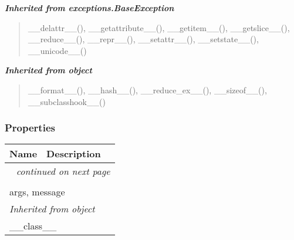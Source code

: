 \large{\textbf{\textit{Inherited from exceptions.BaseException}}}

\begin{quote}
\_\_delattr\_\_(), \_\_getattribute\_\_(), \_\_getitem\_\_(), \_\_getslice\_\_(), \_\_reduce\_\_(), \_\_repr\_\_(), \_\_setattr\_\_(), \_\_setstate\_\_(), \_\_unicode\_\_()
\end{quote}

\large{\textbf{\textit{Inherited from object}}}

\begin{quote}
\_\_format\_\_(), \_\_hash\_\_(), \_\_reduce\_ex\_\_(), \_\_sizeof\_\_(), \_\_subclasshook\_\_()
\end{quote}


  \subsubsection{Properties}

    \vspace{-1cm}
\hspace{\varindent}\begin{longtable}{|p{\varnamewidth}|p{\vardescrwidth}|l}
\cline{1-2}
\cline{1-2} \centering \textbf{Name} & \centering \textbf{Description}& \\
\cline{1-2}
\endhead\cline{1-2}\multicolumn{3}{r}{\small\textit{continued on next page}}\\\endfoot\cline{1-2}
\endlastfoot\multicolumn{2}{|l|}{\textit{Inherited from exceptions.BaseException}}\\
\multicolumn{2}{|p{\varwidth}|}{\raggedright args, message}\\
\cline{1-2}
\multicolumn{2}{|l|}{\textit{Inherited from object}}\\
\multicolumn{2}{|p{\varwidth}|}{\raggedright \_\_class\_\_}\\
\cline{1-2}
\end{longtable}

